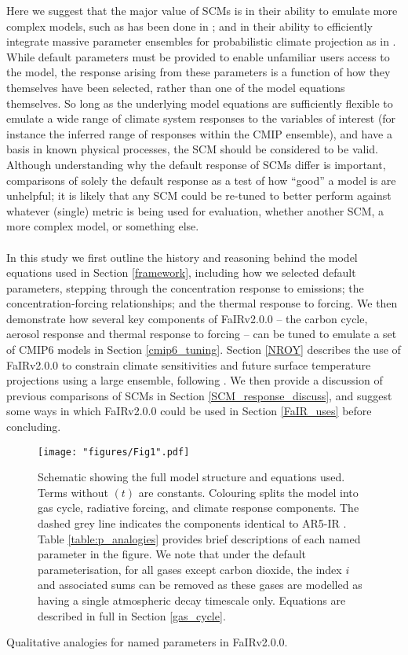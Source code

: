 \documentclass[gmd, manuscript]{copernicus}
\begin{document}
Here we suggest that the major value of SCMs is in their ability to emulate more complex models, such as has been done in \cite{Meinshausen2011b,Tsutsui2017,Tsutsui2020}; and in their ability to efficiently integrate massive parameter ensembles for probabilistic climate projection as in \cite{Smith2018,Goodwin2019}. While default parameters must be provided to enable unfamiliar users access to the model, the response arising from these parameters is a function of how they themselves have been selected, rather than one of the model equations themselves. So long as the underlying model equations are sufficiently flexible to emulate a wide range of climate system responses to the variables of interest (for instance the inferred range of responses within the CMIP ensemble), and have a basis in known physical processes, the SCM should be considered to be valid. Although understanding why the default response of SCMs differ is important, comparisons of solely the default response as a test of how ``good'' a model is are unhelpful; it is likely that any SCM could be re-tuned to better perform against whatever (single) metric is being used for evaluation, whether another SCM, a more complex model, or something else.\\\\
%
In this study we first outline the history and reasoning behind the model equations used in Section \ref{framework}, including how we selected default parameters, stepping through the concentration response to emissions; the concentration-forcing relationships; and the thermal response to forcing. We then demonstrate how several key components of FaIRv2.0.0 -- the carbon cycle, aerosol response and thermal response to forcing -- can be tuned to emulate a set of CMIP6 models in Section \ref{cmip6_tuning}. Section \ref{NROY} describes the use of FaIRv2.0.0 to constrain climate sensitivities and future surface temperature projections using a large ensemble, following \cite{Smith2018}. We then provide a discussion of previous comparisons of SCMs in Section \ref{SCM_response_discuss}, and suggest some ways in which FaIRv2.0.0 could be used in Section \ref{FaIR_uses} before concluding.
\clearpage
%
\begin{figure}[t]
    \texttt{[image: "figures/Fig1".pdf]}
    \caption{Schematic showing the full model structure and equations used. Terms without $(t)$ are constants. Colouring splits the model into gas cycle, radiative forcing, and climate response components. The dashed grey line indicates the components identical to AR5-IR \citep{Myhre2013a}. Table \ref{table:p_analogies} provides brief descriptions of each named parameter in the figure. We note that under the default parameterisation, for all gases except carbon dioxide, the index $i$ and associated sums can be removed as these gases are modelled as having a single atmospheric decay timescale only. Equations are described in full in Section \ref{gas_cycle}.}
    \label{fig:schematic}
\end{figure}
\clearpage
%
\begin{table}[t]
    \caption{Qualitative analogies for named parameters in FaIRv2.0.0.}
    \label{table:p_analogies}
    
\end{table}
\clearpage
%
\end{document}
